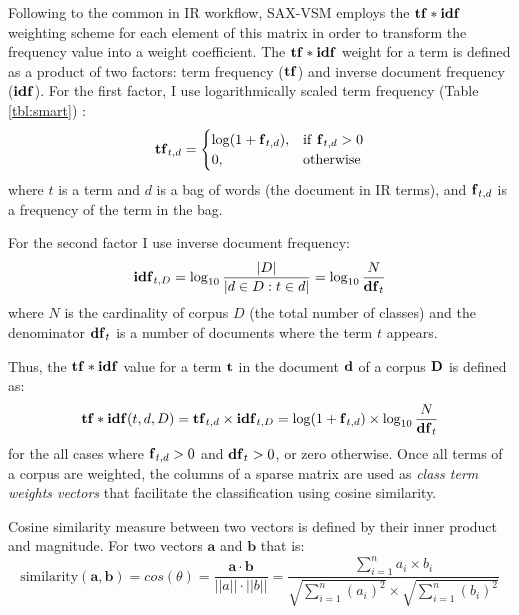 Following to the common in IR workflow, SAX-VSM employs the $\text{\textbf{tf}}\ast\text{\textbf{idf}}$ weighting scheme 
\cite{citeulike:4469058} for each element of this matrix in order to transform the frequency value into a 
weight coefficient. 
The $\text{\textbf{tf}}\ast\text{\textbf{idf}}$ weight for a term is defined as a product of two factors: term frequency ($\text{\textbf{tf}}$) 
and inverse document frequency ($\text{\textbf{idf}}$). 
For the first factor, I use logarithmically scaled term frequency (Table \ref{tbl:smart}) \cite{citeulike:4469058}:
\begin{equation}
 \mbox{\textbf{tf}}_{t, d} =  \begin{cases} \log(1 + \mbox{\textbf{f}}_{t,d}), &\mbox{if \textbf{f}}_{t,d}>0  \\
0, & \mbox{otherwise} \end{cases}
\end{equation} 
where $t$ is a term and $d$ is a bag of words (the document in IR terms), and $\mbox{\textbf{f}}_{t,d}$ 
is a frequency of the term in the bag.

For the second factor I use inverse document frequency:
\begin{equation}
 \mbox{\textbf{idf}}_{t, D} =  \log_{10}\frac{|D|}{|d \in D : t \in d|} = \log_{10}\frac{N}{\mbox{\textbf{df}}_{t}}
 \label{formula:idf}
\end{equation} 
where $N$ is the cardinality of corpus $D$ (the total number of classes) and the 
denominator $\mbox{\textbf{df}}_{t}$ is a number of documents where the term $t$ appears.

Thus, the $\text{\textbf{tf}} \ast \text{\textbf{idf}}$ value for a term $\text{\textbf{t}}$ in the document 
$\text{\textbf{d}}$ of a corpus $\text{\textbf{D}}$ is defined as:
\begin{equation}
 \text{\textbf{tf}} \ast \text{\textbf{idf}}(t, d, D) =  \text{\textbf{tf}}_{t, d} \times \text{\textbf{idf}}_{t, D} = \log(1 + \text{\textbf{f}}_{t,d})
\times \log_{10}\frac{N}{\mbox{\textbf{df}}_{t}}
 \label{formula:tfidf}
\end{equation} 
for the all cases where $\mbox{\textbf{f}}_{t,d}>0$ and $\mbox{\textbf{df}}_{t}>0$, or zero otherwise.
Once all terms of a corpus are weighted, the columns of a sparse matrix are used 
as \textit{class term weights vectors} that facilitate the classification using cosine similarity. 

Cosine similarity measure between two vectors is defined by their inner product and magnitude. 
For two vectors $\mathbf{a}$ and $\mathbf{b}$ that is:
\begin{equation}
\mbox{similarity}(\mathbf{a},\mathbf{b}) = cos(\theta) = 
\frac{ \mathbf{a} \cdot \mathbf{b} } {\left| \left| a \right| \right| \cdot \left| \left| b \right|\right|} =
\frac{ \sum\limits_{i=1}^{n}{a_{i} \times b_{i}} }{ \sqrt{\sum\limits_{i=1}^{n}{(a_{i})^2}} \times \sqrt{\sum\limits_{i=1}^{n}{(b_{i})^2}}}
\end{equation} 

